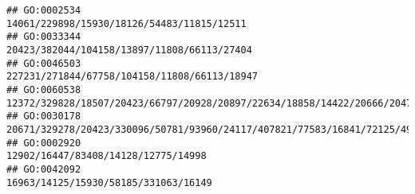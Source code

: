 \documentclass[
]{article}
\begin{document}
\begin{verbatim}
## GO:0002534                                                                                                                                                                                                                                                                                                                                                                   14061/229898/15930/18126/54483/11815/12511
## GO:0033344                                                                                                                                                                                                                                                                                                                                                                  20423/382044/104158/13897/11808/66113/27404
## GO:0046503                                                                                                                                                                                                                                                                                                                                                                 227231/271844/67758/104158/11808/66113/18947
## GO:0060538                                                                                                                                                                                                                                                                                                                   12372/329828/18507/20423/66797/20928/20897/22634/18858/14422/20666/20474/65256/17263/21380
## GO:0030178                                                                                                                                                                                                                                                                                                                                  20671/329278/20423/330096/50781/93960/24117/407821/77583/16841/72125/494504
## GO:0002920                                                                                                                                                                                                                                                                                                                                                                          12902/16447/83408/14128/12775/14998
## GO:0042092                                                                                                                                                                                                                                                                                                                                                                         16963/14125/15930/58185/331063/16149

\end{verbatim}
\end{document}
